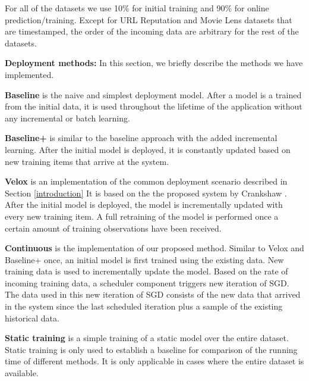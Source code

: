 \documentclass{vldb}
\begin{document}
For all of the datasets we use 10\% for initial training and 90\% for online prediction/training.
Except for URL Reputation and Movie Lens datasets that are timestamped, the order of the incoming data are arbitrary for the rest of the datasets.

\textbf{Deployment methods:} In this section, we briefly describe the methods we have implemented.

\textbf{Baseline} is the naive and simplest deployment model. 
After a model is a trained from the initial data, it is used throughout the lifetime of the application without any incremental or batch learning.

\textbf{Baseline+} is similar to the baseline approach with the added incremental learning.
After the initial model is deployed, it is constantly updated based on new training items that arrive at the system.

\textbf{Velox} is an implementation of the common deployment scenario described in Section \ref{introduction}
It is based on the the proposed system by Crankshaw \cite{crankshaw2014missing}. 
After the initial model is deployed, the model is incrementally updated with every new training item.
A full retraining of the model is performed once a certain amount of training observations have been received.

\textbf{Continuous} is the implementation of our proposed method. 
Similar to Velox and Baseline+ once, an initial model is first trained using the existing data.
New training data is used to incrementally update the model.
Based on the rate of incoming training data, a scheduler component triggers new iteration of SGD.
The data used in this new iteration of SGD consists of the new data that arrived in the system since the last scheduled iteration plus a sample of the existing historical data.

\textbf{Static training} is a simple training of a static model over the entire dataset. 
Static training is only used to establish a baseline for comparison of the running time of different methods.
It is only applicable in cases where the entire dataset is available.
\end{document}
